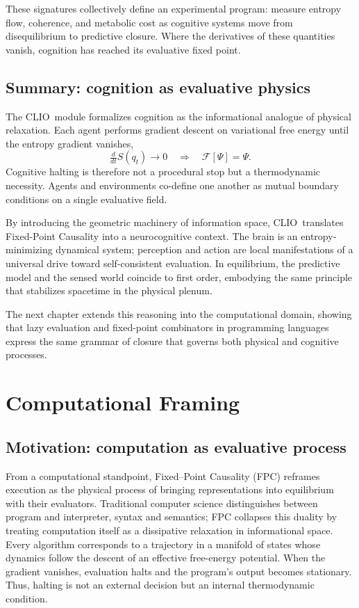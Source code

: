 \documentclass[12pt,a4paper]{article}
\newcommand{\CLIO}{CLIO}              %
\newcommand{\ddt}{\tfrac{d}{dt}}      %
\newcommand{\State}{\Psi}             %
\newcommand{\F}{\mathcal{F}}          %
\theoremstyle{plain}
\begin{document}
These signatures collectively define an experimental program:
measure entropy flow, coherence, and metabolic cost as cognitive systems move from disequilibrium to predictive closure.
Where the derivatives of these quantities vanish, cognition has reached its evaluative fixed point.

\subsection{Summary: cognition as evaluative physics}
The \CLIO\ module formalizes cognition as the informational analogue of physical relaxation.
Each agent performs gradient descent on variational free energy until the entropy gradient vanishes,
\[
\ddt S(q_t) \to 0 \quad \Rightarrow \quad \F[\State] = \State.
\]
Cognitive halting is therefore not a procedural stop but a thermodynamic necessity.
Agents and environments co-define one another as mutual boundary conditions on a single evaluative field.

By introducing the geometric machinery of information space, \CLIO\ translates Fixed-Point Causality into a neurocognitive context.
The brain is an entropy-minimizing dynamical system; perception and action are local manifestations of a universal drive toward self-consistent evaluation.
In equilibrium, the predictive model and the sensed world coincide to first order, embodying the same principle that stabilizes spacetime in the physical plenum.

The next chapter extends this reasoning into the computational domain,
showing that lazy evaluation and fixed-point combinators in programming languages express the same grammar of closure that governs both physical and cognitive processes.


\section{Computational Framing}
\label{sec:computational}

\subsection{Motivation: computation as evaluative process}
From a computational standpoint, Fixed--Point Causality (FPC) reframes execution as the physical process of bringing representations into equilibrium with their evaluators.  
Traditional computer science distinguishes between program and interpreter, syntax and semantics; FPC collapses this duality by treating computation itself as a dissipative relaxation in informational space.  
Every algorithm corresponds to a trajectory in a manifold of states whose dynamics follow the descent of an effective free-energy potential.  
When the gradient vanishes, evaluation halts and the program’s output becomes stationary.  
Thus, halting is not an external decision but an internal thermodynamic condition.
\end{document}
